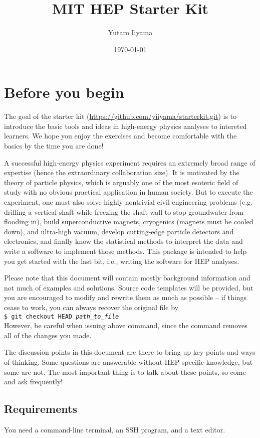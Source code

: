 \documentclass[12pt]{article}
\title{MIT HEP Starter Kit}
\author{Yutaro Iiyama}
\date{\today}
\newcommand{\terminal}[1]{\vspace{3pt}\texttt{\$ #1} \\}
\begin{document}
\maketitle

\section*{Before you begin}
The goal of the starter kit (\url{https://github.com/yiiyama/starterkit.git}) is to introduce the basic tools and ideas in high-energy physics analyses to intereted learners. We hope you enjoy the exercises and become comfortable with the basics by the time you are done!

A successful high-energy physics experiment requires an extremely broad range of expertise (hence the extraordinary collaboration size). It is motivated by the theory of particle physics, which is arguably one of the most esoteric field of study with no obvious practical application in human society. But to execute the experiment, one must also solve highly nontrivial civil engineering problems (e.g. drilling a vertical shaft while freezing the shaft wall to stop groundwater from flooding in), build superconductive magnets, cryogenics (magnets must be cooled down), and ultra-high vacuum, develop cutting-edge particle detectors and electronics, and finally know the statistical methods to interpret the data and write a software to implement those methods. This package is intended to help you get started with the last bit, i.e., writing the software for HEP analyses.

Please note that this document will contain mostly background information and not much of examples and solutions. Source code templates will be provided, but you are encouraged to modify and rewrite them as much as possible -- if things cease to work, you can always recover the original file by \\
\terminal{git checkout HEAD \textit{path\_to\_file}}
However, be careful when issuing above command, since the command removes all of the changes you made.

The discussion points in this document are there to bring up key points and ways of thinking. Some questions are answerable without HEP-specific knowledge, but some are not. The most important thing is to talk about these points, so come and ask frequently!

\subsection*{Requirements}
You need a command-line terminal, an SSH program, and a text editor.
\end{document}

